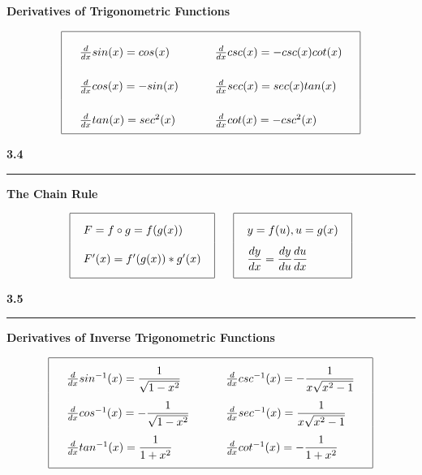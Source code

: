 \documentclass{article}
\begin{document}
\begin{center}
\large\textbf{Derivatives of Trigonometric Functions}
\begin{large}
\[\arraycolsep=16pt\def\arraystretch{2.5}
\begin{array}{| l l |}
	\hline
	\frac{d}{dx} sin(x) = cos(x) & \frac{d}{dx} csc (x) = -csc(x) cot(x) \\
	\frac{d}{dx} cos(x) = -sin(x) & \frac{d}{dx} sec (x) = sec(x) tan(x) \\
	\frac{d}{dx} tan(x) = sec^2(x) & \frac{d}{dx} cot (x) = -csc^2(x) \\
	\hline
\end{array}
\]
\end{large}
\vspace{16pt}

\Large\textbf{3.4}

\noindent\hfill\rule{0.3\textwidth}{.4pt}\hfill
\vspace{12pt}

\large\textbf{The Chain Rule}\\
\begin{large}
\[\arraycolsep=12pt\def\arraystretch{2.1}
\begin{array}{|l|}
	\hline
	F = f \circ g = f(g(x)) \\
	F'(x) = f'(g(x)) * g'(x) \\
	[\medskipamount]
	\hline
	\end{array} \mkern30mu 
\begin{array}{|l|}
	\hline
	y = f(u), u = g(x) \\
	\dfrac{dy}{dx} = \dfrac{dy}{du} \dfrac{du}{dx} \\
	[\medskipamount]
	\hline
	\end{array}
\]
\end{large}
\end{center}
\vspace{16pt}

\begin{center}
\Large\textbf{3.5}

\noindent\hfill\rule{0.3\textwidth}{.4pt}\hfill
\vspace{12pt}

\large\textbf{Derivatives of Inverse Trigonometric Functions}
\begin{large}
\[\arraycolsep=16pt\def\arraystretch{2.5}
\begin{array}{| l l |}
	\hline
	\frac{d}{dx} sin^{-1}(x) = \dfrac{1}{\sqrt{1-x^2}} & \frac{d}{dx} csc^{-1}(x) =  -\dfrac{1}{x\sqrt{x^2-1}} \\
	\frac{d}{dx} cos^{-1}(x) = -\dfrac{1}{\sqrt{1-x^2}} & \frac{d}{dx} sec^{-1}(x) = \dfrac{1}{x\sqrt{x^2-1}} \\
	\frac{d}{dx} tan^{-1}(x) = \dfrac{1}{1+x^2} & \frac{d}{dx} cot^{-1}(x) =  -\dfrac{1}{1+x^2} \\
	[\medskipamount]	
	\hline
\end{array}
\]
\end{large}
\end{center}
\pagebreak
\end{document}
